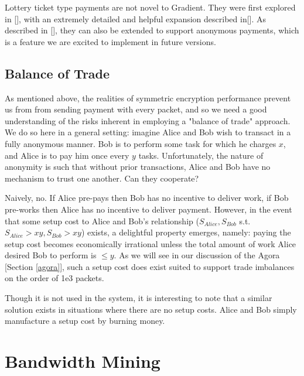 \documentclass{article}
\begin{document}
Lottery ticket type payments are not novel to Gradient. They were first explored in [], with an extremely detailed and helpful expansion described in[]. As described in [], they can also be extended to support anonymous payments, which is a feature we are excited to implement in future versions.

\subsection{Balance of Trade}
\label{tokens-bot}

As mentioned above, the realities of symmetric encryption performance prevent us from from sending payment with every packet, and so we need a good understanding of the risks inherent in employing a "balance of trade" approach. We do so here in a general setting: imagine Alice and Bob wish to transact in a fully anonymous manner. Bob is to perform some task for which he charges $x$, and Alice is to pay him once every $y$ tasks. Unfortunately, the nature of anonymity is such that without prior transactions, Alice and Bob have no mechanism to trust one another. Can they cooperate?

Naively, no. If Alice pre-pays then Bob has no incentive to deliver work, if Bob pre-works then Alice has no incentive to deliver payment. However, in the event that some setup cost to Alice and Bob's relationship ($S_{Alice}, S_{Bob}$ s.t. $S_{Alice} > xy, S_{Bob} > xy$) exists, a delightful property emerges, namely: paying the setup cost becomes economically irrational unless the total amount of work Alice desired Bob to perform is $\leq y$. As we will see in our discussion of the Agora [Section \ref{agora}], such a setup cost does exist suited to support trade imbalances on the order of 1e3 packets.

Though it is not used in the system, it is interesting to note that a similar solution exists in situations where there are no setup costs. Alice and Bob simply manufacture a setup cost by burning money.

\section{Bandwidth Mining}

\begin{figure}[htbp]
  \centering
  
  \caption{}
\end{figure}
\end{document}
